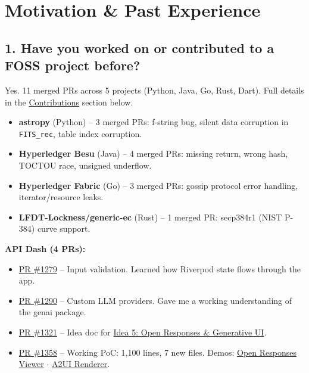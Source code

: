 \documentclass[11pt,a4paper]{article}
\begin{document}
\section{Motivation \& Past Experience}

\subsection{1. Have you worked on or contributed to a FOSS project before?}

Yes. 11 merged PRs across 5 projects (Python, Java, Go, Rust, Dart). Full details in the \hyperref[sec:contributions]{Contributions} section below.

\begin{itemize}
  \item \textbf{astropy} (Python) -- 3 merged PRs: f-string bug, silent data corruption in \texttt{FITS\_rec}, table index corruption.
  \item \textbf{Hyperledger Besu} (Java) -- 4 merged PRs: missing return, wrong hash, TOCTOU race, unsigned underflow.
  \item \textbf{Hyperledger Fabric} (Go) -- 3 merged PRs: gossip protocol error handling, iterator/resource leaks.
  \item \textbf{LFDT-Lockness/generic-ec} (Rust) -- 1 merged PR: secp384r1 (NIST P-384) curve support.
\end{itemize}

\textbf{API Dash (4 PRs):}

\begin{itemize}
  \item \href{https://github.com/foss42/apidash/pull/1279}{PR \#1279} -- Input validation. Learned how Riverpod state flows through the app.
  \item \href{https://github.com/foss42/apidash/pull/1290}{PR \#1290} -- Custom LLM providers. Gave me a working understanding of the genai package.
  \item \href{https://github.com/foss42/apidash/pull/1321}{PR \#1321} -- Idea doc for \href{https://github.com/foss42/apidash/discussions/1227}{Idea 5: Open Responses \& Generative UI}.
  \item \href{https://github.com/foss42/apidash/pull/1358}{PR \#1358} -- Working PoC: 1,100 lines, 7 new files. Demos: \href{https://youtu.be/paN-KGIhNms}{Open Responses Viewer} $\cdot$ \href{https://youtu.be/T2KbHth736U}{A2UI Renderer}.
\end{itemize}
\end{document}
